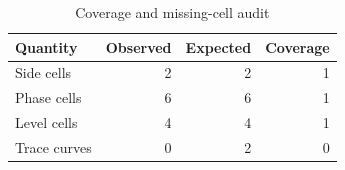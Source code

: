 \begin{table}[htbp]
\centering
\caption{Coverage and missing-cell audit}
\small
\begin{tabular}{@{}lrrr@{}}
\toprule
Quantity & Observed & Expected & Coverage \\
\midrule
Side cells & 2 & 2 & 1 \\
Phase cells & 6 & 6 & 1 \\
Level cells & 4 & 4 & 1 \\
Trace curves & 0 & 2 & 0 \\
\bottomrule
\end{tabular}
\end{table}
